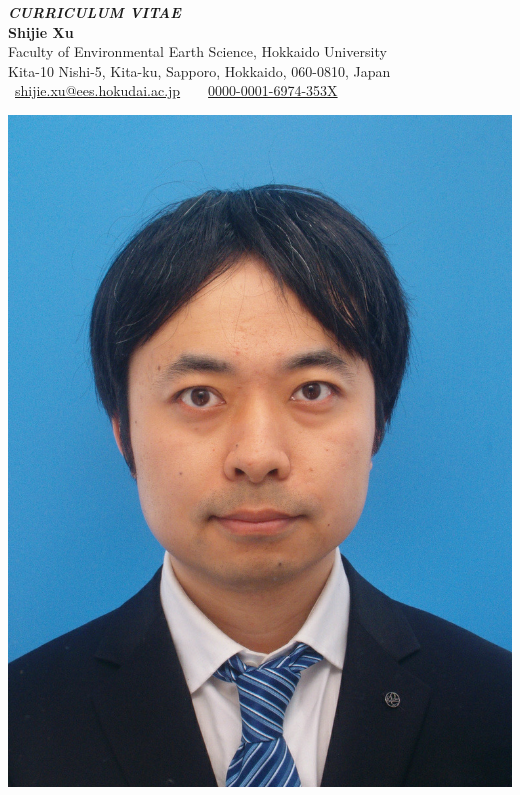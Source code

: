 \documentclass[a4paper,11pt]{article}
\begin{document}
\begin{minipage}[c]{0.75\textwidth} %
    {\Huge \textbf{\textit{CURRICULUM VITAE}}}\vspace{1cm}\\
    {\Huge \textbf{Shijie Xu}}\vspace{1cm}\\
    Faculty of Environmental Earth Science, Hokkaido University\\
    Kita-10 Nishi-5, Kita-ku, Sapporo, Hokkaido, 060-0810, Japan\\

    \faEnvelope~\href{mailto:shijie.xu@ees.hokudai.ac.jp}{shijie.xu@ees.hokudai.ac.jp}~~~\color{orcid}{\faOrcid}~\href{https://orcid.org/0000-0001-6974-353X}{0000-0001-6974-353X}
\end{minipage}
\hfill
\begin{minipage}[c]{0.2\textwidth} %
    \includegraphics[width=\linewidth]{profile.JPG} %
\end{minipage}
\end{document}
